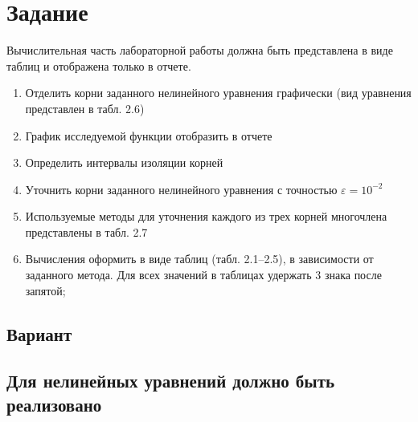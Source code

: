 \documentclass{article}
\begin{document}
\itmo[
      variant=13,
      labn=2,
      discipline=Вычислительная математика,
      group=P3212,
      student=Соколов Анатолий Владимирович,
      teacher=Наумова Надежда Александровна 
]
\lstset{language=rust}
\tableofcontents

\section{Задание}
      Вычислительная часть лабораторной работы должна быть представлена в виде таблиц и отображена только в отчете.
      \begin{enumerate}
            \item Отделить корни заданного нелинейного уравнения графически (вид уравнения представлен в табл. 2.6)
            \item График исследуемой функции отобразить в отчете
            \item Определить интервалы изоляции корней
            \item Уточнить корни заданного нелинейного уравнения с точностью $\varepsilon=10^{-2}$
            \item Используемые методы для уточнения каждого из трех корней многочлена представлены в табл. 2.7
            \item Вычисления оформить в виде таблиц (табл. 2.1–2.5), в зависимости от заданного метода. Для всех значений в таблицах удержать 3 знака после запятой;
      \end{enumerate}

\subsection{Вариант}

\subsection{Для нелинейных уравнений должно быть реализовано}
\end{document}
